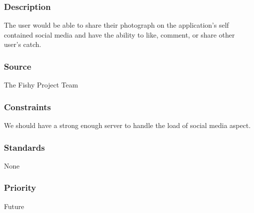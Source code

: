 \subsubsection{Description}
The user would be able to share their photograph on the application's self contained social media and have the ability to like, comment, or share other user's catch.
\subsubsection{Source}
The Fishy Project Team
\subsubsection{Constraints}
We should have a strong enough server to handle the load of social media aspect.
\subsubsection{Standards}
None
\subsubsection{Priority}
Future